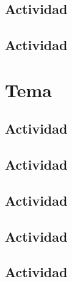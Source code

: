 \documentclass[12pt,examen]{repaso_layout}
\begin{document}
\begin{questions}
    \subsection{Actividad}
    \subsection{Actividad}
        \section{Tema}
    \subsection{Actividad}
    \subsection{Actividad}
    \subsection{Actividad}
    \subsection{Actividad}
    \subsection{Actividad}
\end{questions}
\end{document}

